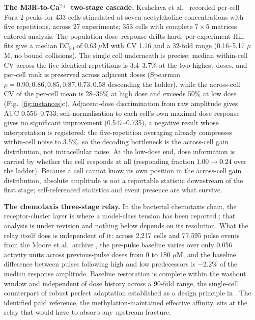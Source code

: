 \documentclass[11pt,a4paper]{article}
\begin{document}
\textbf{The M3R-to-Ca$^{2+}$ two-stage cascade.} Keshelava et al.\ \cite{Keshelava2018} recorded per-cell Fura-2 peaks for 433 cells stimulated at seven acetylcholine concentrations with five repetitions, across 27 experiments; 353 cells with complete $7\times5$ matrices entered analysis. The population dose--response drifts hard: per-experiment Hill fits give a median EC$_{50}$ of $0.63\ \mu$M with CV 1.16 and a 32-fold range (0.16--5.17 $\mu$M, no bound collisions). The single cell underneath is precise: median within-cell CV across the five identical repetitions is 3.4--3.7\% at the two highest doses, and per-cell rank is preserved across adjacent doses (Spearman $\rho=0.90, 0.86, 0.85, 0.87, 0.73, 0.58$ descending the ladder), while the across-cell CV of the per-cell mean is 28--36\% at high dose and exceeds 50\% at low dose (Fig.~\ref{fig:instances}c). Adjacent-dose discrimination from raw amplitude gives AUC 0.556--0.733; self-normalisation to each cell's own maximal-dose response gives no significant improvement (0.547--0.735), a negative result whose interpretation is registered: the five-repetition averaging already compresses within-cell noise to 3.5\%, so the decoding bottleneck is the across-cell gain distribution, not intracellular noise. At the low-dose end, dose information is carried by whether the cell responds at all (responding fraction $1.00\to0.24$ over the ladder). Because a cell cannot know its own position in the across-cell gain distribution, absolute amplitude is not a reportable statistic downstream of the first stage; self-referenced statistics and event presence are what survive.

\textbf{The chemotaxis three-stage relay.} In the bacterial chemotaxis chain, the receptor-cluster layer is where a model-class tension has been reported \cite{CompanionChemo}; that analysis is under revision and nothing below depends on its resolution. What the relay itself does is independent of it: across 2,217 cells and 77,595 pulse events from the Moore et al.\ archive \cite{Moore2024}, the pre-pulse baseline varies over only 0.056 activity units across previous-pulse doses from 0 to 180 $\mu$M, and the baseline difference between pulses following high and low predecessors is $-2.2\%$ of the median response amplitude. Baseline restoration is complete within the washout window and independent of dose history across a 90-fold range, the single-cell counterpart of robust perfect adaptation established as a design principle in \cite{Barkai1997,Yi2000}. The identified paid reference, the methylation-maintained effective affinity, sits at the relay that would have to absorb any upstream fracture.
\end{document}
